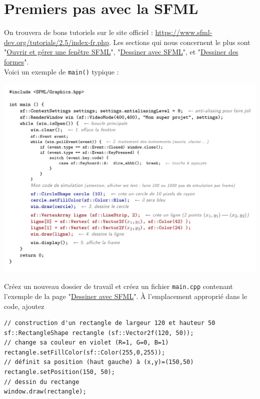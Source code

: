 \documentclass{book}
\newcommand{\inline}[1]{\texttt{#1}}
\def\filename{\texttt}
\begin{document}
\section{Premiers pas avec la SFML}

On trouvera de bons tutoriels sur le site officiel : \url{https://www.sfml-dev.org/tutorials/2.5/index-fr.php}. Les sections qui nous concernent le plus sont "\href{https://www.sfml-dev.org/tutorials/2.5/window-window-fr.php}{Ouvrir et gérer une fenêtre SFML}", "\href{https://www.sfml-dev.org/tutorials/2.5/graphics-draw-fr.php}{Dessiner avec SFML}", et "\href{https://www.sfml-dev.org/tutorials/2.5/graphics-shape-fr.php}{Dessiner des formes}".\\

\newpage
Voici un exemple de \inline{main()} typique :
\begin{center}
\includegraphics[width=0.95\linewidth]{Tuto_SFML/template_main_sfml.pdf}
\end{center}

Créez un nouveau dossier de travail et créez un fichier \filename{main.cpp} contenant l'exemple de la page "\href{https://www.sfml-dev.org/tutorials/2.5/graphics-draw-fr.php}{Dessiner avec SFML}". À l'emplacement approprié dans le code, ajoutez
\begin{verbatim}
// construction d'un rectangle de largeur 120 et hauteur 50
sf::RectangleShape rectangle (sf::Vector2f(120, 50));
// change sa couleur en violet (R=1, G=0, B=1)
rectangle.setFillColor(sf::Color(255,0,255));
// définit sa position (haut gauche) à (x,y)=(150,50)
rectangle.setPosition(150, 50);
// dessin du rectange
window.draw(rectangle);
\end{verbatim}
\end{document}
